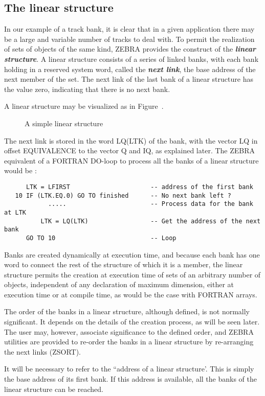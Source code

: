 \subsection{The linear structure}
\par
In our example of a track bank, it is clear that in a given application
there may be a large and variable number of tracks to deal with.
To permit the realization of sets of objects of the same kind, ZEBRA
provides the construct of the {\bf\it linear structure}.
A linear structure consists of a series of linked banks, with each bank
holding in a reserved system word, called the {\bf\it next link},
the base address of the next member of the set. The next link of the
last bank of a linear structure has the value zero, indicating that
there is no next bank.
\par
A linear structure may be visualized as in Figure~\pageref{LINSTRU}.
\begin{figure}%
\caption{A simple linear structure}
\label{LINSTRU}
\end{figure}
The next link is stored in the word LQ(LTK) of the bank,
with the vector LQ
in offset EQUIVALENCE to the vector Q and IQ, as explained later.
The ZEBRA equivalent of a FORTRAN DO-loop to process
all the banks of a linear structure would be :
\begin{verbatim}
      LTK = LFIRST                      -- address of the first bank
   10 IF (LTK.EQ.0) GO TO finished      -- No next bank left ?
            .....                       -- Process data for the bank at LTK
          LTK = LQ(LTK)                 -- Get the address of the next bank
      GO TO 10                          -- Loop
\end{verbatim}
Banks are created dynamically at execution time, and because each
bank has one word to connect the rest of the structure of which it is a
member, the linear structure permits the creation at
execution time of sets of an arbitrary number of objects,
independent of any declaration of maximum dimension, either at
execution time or at compile time, as would be the case with FORTRAN
arrays.
\par
The order of the banks in a linear structure, although defined, is not
normally significant. It depends on the details of the creation process,
as will be seen later. The user may, however, associate significance to
the defined order, and ZEBRA utilities are provided to re-order the
banks in a linear structure by re-arranging the next links (ZSORT).
\par
It will be necessary to refer to the
``address of a linear structure'.
This is simply the base address of its first bank. If this address is
available, all the banks of the linear structure can be reached.
